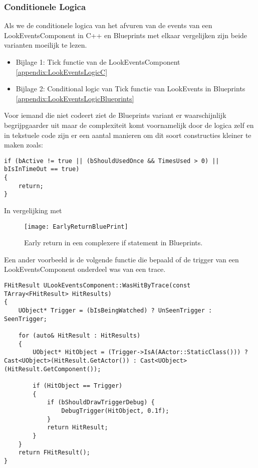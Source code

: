 \subsubsection{Conditionele Logica}

Als we de conditionele logica van het afvuren van de events van een LookEventsComponent in C++ en Blueprints met elkaar vergelijken zijn beide varianten moeilijk te lezen.

\begin{itemize}
	\item Bijlage 1: Tick functie van de LookEventsComponent \ref{appendix:LookEventsLogicC}
	\item Bijlage 2: Conditional logic van Tick functie van LookEvents in Blueprints \ref{appendix:LookEventsLogicBlueprints}
\end{itemize}

Voor iemand die niet codeert ziet de Blueprints variant er waarschijnlijk begrijpgaarder uit maar de complexiteit komt voornamelijk door de logica zelf en in tekstuele code zijn er een aantal manieren om dit soort constructies kleiner te maken zoals:

\begin{lstlisting}[caption=Early return in een complexere if statement in C++]
if (bActive != true || (bShouldUsedOnce && TimesUsed > 0) || bIsInTimeOut == true) 
{
	return;
}
\end{lstlisting}
In vergelijking met 

\begin{figure}[!ht]
  \centering
    \texttt{[image: EarlyReturnBluePrint]}
    \caption{Early return in een complexere if statement in Blueprints.}
\end{figure}

Een ander voorbeeld is de volgende functie die bepaald of de trigger van een LookEventsComponent onderdeel was van een trace.

\begin{lstlisting}[caption=Een functie die kijkt of de huidige component geraakt is door een trace]
FHitResult ULookEventsComponent::WasHitByTrace(const TArray<FHitResult> HitResults) 
{
	UObject* Trigger = (bIsBeingWatched) ? UnSeenTrigger : SeenTrigger;

	for (auto& HitResult : HitResults)
	{
		UObject* HitObject = (Trigger->IsA(AActor::StaticClass())) ? Cast<UObject>(HitResult.GetActor()) : Cast<UObject>(HitResult.GetComponent());	

		if (HitObject == Trigger)
		{
			if (bShouldDrawTriggerDebug) {
				DebugTrigger(HitObject, 0.1f);
			}
			return HitResult;
		}
	}
	return FHitResult();
}
\end{lstlisting}

